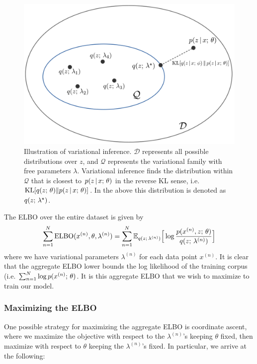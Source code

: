 \documentclass{article}
\begin{document}
\begin{figure}
    \centering
    \includegraphics[scale=0.25]{pics/vi.png}
    \caption{Illustration of variational inference. $\mathcal{D}$ represents all possible distributions
    over $z$, and $\mathcal{Q}$ represents the variational family with free parameters $\lambda$. Variational inference finds the distribution within $\mathcal{Q}$ that is closest to $p(z \,|\, x ; \, \theta)$
    in the reverse KL sense, i.e. $\operatorname*{KL}[q(z ; \, \theta) \Vert p(z \,|\, x ; \, \theta)]$. In the above this  distribution is denoted as $q(z ; \, \lambda^\star)$.}
    \label{fig:vi}
\end{figure}

The ELBO over the entire dataset is given by
\[ \sum_{n=1}^N \operatorname*{ELBO}(x^{(n)}, \theta, \lambda^{(n)}) = \sum_{n=1}^N \mathbb{E}_{q(z ; \, \lambda^{(n)})}\Big[\log \frac{p(x^{(n)}, z ; \, \theta)}{q(z ; \, \lambda^{(n)})}\Big]  \]
where we have variational parameters $\lambda^{(n)}$ for each data point $x^{(n)}$. It is clear that the aggregate ELBO lower bounds the log likelihood of the training corpus (i.e. $\sum_{n=1}^N \log p(x^{(n)} ; \, \theta)$. It is this aggregate ELBO that we wish to maximize to train our model.

\subsubsection{Maximizing the ELBO}
One possible strategy for maximizing the aggregate ELBO is coordinate ascent, where we 
maximize the objective with respect to the $\lambda^{(n)}$'s keeping $\theta$ fixed, then maximize 
with respect to $\theta$ keeping the $\lambda^{(n)}$'s fixed. In particular, we arrive at the following:
\end{document}
